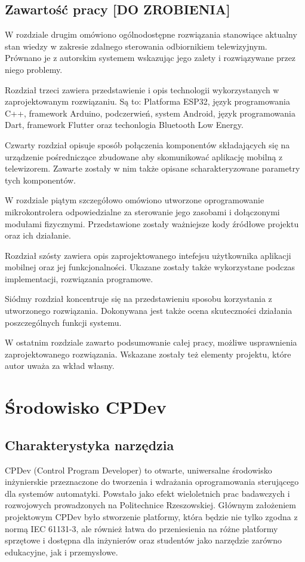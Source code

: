 \documentclass[12pt,twoside]{article}
\begin{document}
\subsection{Zawartość pracy [DO ZROBIENIA]}
W rozdziale drugim  omówiono ogólnodostępne rozwiązania stanowiące aktualny stan wiedzy w zakresie zdalnego sterowania odbiornikiem telewizyjnym. Prównano je z autorskim systemem wskazując jego zalety i rozwiązywane przez niego problemy.

Rozdział trzeci zawiera przedstawienie i opis technologii wykorzystanych w zaprojektowanym rozwiązaniu. Są to: Platforma ESP32, język programowania C++, framework Arduino, podczerwień, system Android, język programowania Dart, framework Flutter oraz techonlogia Bluetooth Low Energy.

Czwarty rozdział opisuje sposób połączenia komponentów składających się na urządzenie pośredniczące zbudowane aby skomunikować aplikację mobilną z telewizorem. Zawarte zostały w nim także opisane scharakteryzowane parametry tych komponentów.

W rozdziale piątym szczegółowo omówiono utworzone oprogramowanie mikrokontrolera odpowiedzialne za sterowanie jego zasobami i dołączonymi modułami fizycznymi. Przedstawione zostały ważniejsze kody źródłowe projektu oraz ich działanie.

Rozdział szósty zawiera opis zaprojektowanego intefejsu użytkownika aplikacji mobilnej oraz jej funkcjonalności. Ukazane zostały także wykorzystane podczas implementacji, rozwiązania programowe.

Siódmy rozdział koncentruje się na przedstawieniu sposobu korzystania z utworzonego rozwiązania. Dokonywana jest także ocena skuteczności działania poszczególnych funkcji systemu.

W ostatnim rozdziale zawarto podsumowanie całej pracy, możliwe usprawnienia zaprojektowanego rozwiązania. Wskazane zostały też elementy projektu, które autor uważa za wkład własny.


\clearpage
\section{Środowisko CPDev}
\subsection{Charakterystyka narzędzia}
CPDev (Control Program Developer) to otwarte, uniwersalne środowisko inżynierskie przeznaczone do tworzenia i wdrażania oprogramowania sterującego dla systemów automatyki. Powstało jako efekt wieloletnich prac badawczych i rozwojowych prowadzonych na Politechnice Rzeszowskiej. Głównym założeniem projektowym CPDev było stworzenie platformy, która będzie nie tylko zgodna z normą IEC 61131-3, ale również łatwa do przeniesienia na różne platformy sprzętowe i dostępna dla inżynierów oraz studentów jako narzędzie zarówno edukacyjne, jak i przemysłowe\cite{cpdevKia}.
\end{document}
